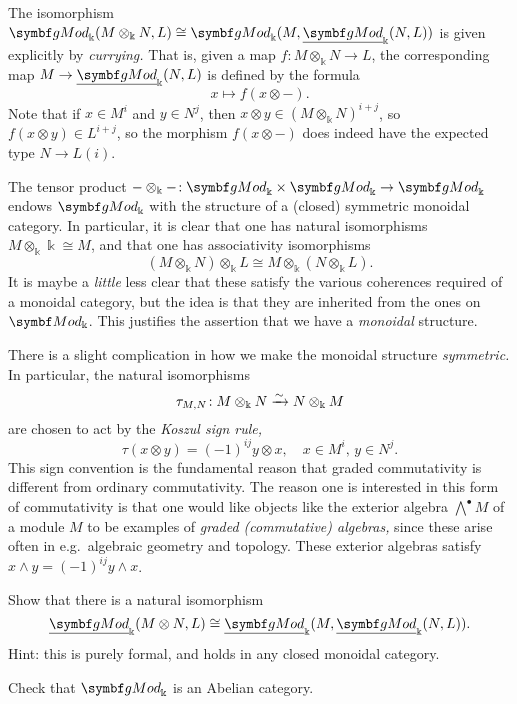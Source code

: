 \begin{remark}
	The isomorphism \(\gMod_\Bbbk(M\otimes_\Bbbk N,L) \cong \gMod_\Bbbk(M,\ugMod_\Bbbk(N,L))\) is given explicitly by \emph{currying.} That is,
	given a map \(f\!:M\otimes_\Bbbk N \to L\), the corresponding map \(M \to \ugMod_\Bbbk(N,L)\) is defined by the formula
	\[ x \mapsto f(x\otimes-). \]
	Note that if \(x\in M^i\) and \(y\in N^j\), then \(x\otimes y \in (M\otimes_\Bbbk N)^{i+j}\), so \(f(x\otimes y) \in L^{i+j}\), so the morphism
	\(f(x\otimes-)\) does indeed have the expected type \(N \to L(i)\).
\end{remark}

The tensor product \(-\otimes_\Bbbk-\!:\gMod_\Bbbk\times\gMod_\Bbbk\to\gMod_\Bbbk\) endows \(\gMod_\Bbbk\) with the structure
of a (closed) symmetric monoidal category. In particular, it is clear that one has natural isomorphisms \(M\otimes_\Bbbk \Bbbk \cong M\),
and that one has associativity isomorphisms
\[ (M\otimes_\Bbbk N)\otimes_\Bbbk L \cong M\otimes_\Bbbk (N\otimes_\Bbbk L). \]
It is maybe a \emph{little} less clear that these satisfy the various coherences required of a monoidal category, but the idea is that
they are inherited from the ones on \(\Mod_\Bbbk\). This justifies the assertion that we have a \emph{monoidal} structure.

There is a slight complication in how we make the monoidal structure \emph{symmetric.} In particular, the natural isomorphisms
\[ \tau_{M,N}\!: M\otimes_\Bbbk N \xrightarrow{\sim} N\otimes_\Bbbk M \]
are chosen to act by the \emph{Koszul sign rule,}
\[ \tau(x\otimes y) = (-1)^{ij} y\otimes x, \quad x\in M^i,\, y\in N^j. \]
This sign convention is the fundamental reason that graded commutativity is different from ordinary commutativity. The reason one is
interested in this form of commutativity is that one would like objects like the exterior algebra \(\bigwedge^\bullet M\) of a module
\(M\) to be examples of \emph{graded (commutative) algebras,} since these arise often in e.g.\ algebraic geometry and topology. These
exterior algebras satisfy \(x\wedge y = (-1)^{ij}y\wedge x\).

\begin{exercise}
	Show that there is a natural isomorphism
	\[ \ugMod_\Bbbk(M\otimes N,L) \cong \ugMod_\Bbbk(M,\ugMod_\Bbbk(N,L)). \]
	Hint: this is purely formal, and holds in any closed monoidal category.
\end{exercise}
\begin{exercise}
	Check that \(\gMod_\Bbbk\) is an Abelian category.
\end{exercise}

